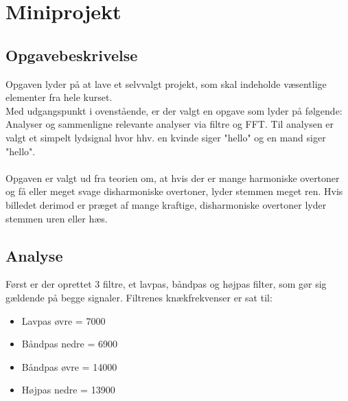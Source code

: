 \chapter{Miniprojekt}
\section{Opgavebeskrivelse}
Opgaven lyder på at lave et selvvalgt projekt, som skal indeholde væsentlige elementer fra hele kurset. \\
Med udgangspunkt i ovenstående, er der valgt en opgave som lyder på følgende: \\
Analyser og sammenligne relevante analyser via filtre og FFT.
Til analysen er valgt et simpelt lydsignal hvor hhv. en kvinde siger "hello" og en mand siger "hello".\\ \\
Opgaven er valgt ud fra teorien om, at hvis der er mange harmoniske overtoner og få eller meget svage disharmoniske overtoner, lyder stemmen meget ren. Hvis billedet derimod er præget af mange kraftige, disharmoniske overtoner lyder stemmen uren eller hæs.
\section{Analyse}
Først er der oprettet 3 filtre, et lavpas, båndpas og højpas filter, som gør sig gældende på begge signaler. Filtrenes knækfrekvenser er sat til:\\
\begin{itemize}
	\item Lavpas øvre = 7000
	\item Båndpas nedre = 6900
	\item Båndpas øvre = 14000
	\item Højpas nedre = 13900
\end{itemize}

